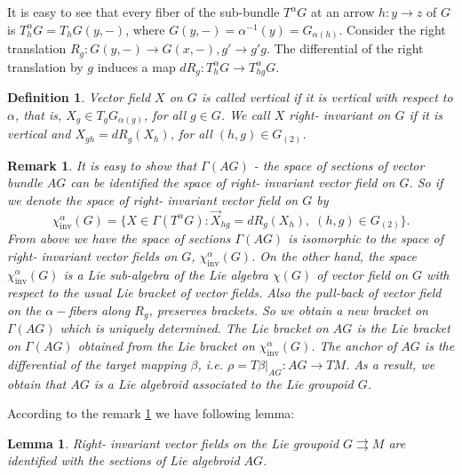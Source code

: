 \documentclass{article}
\newtheorem{definition}[theorem]{Definition}
\newtheorem{lemma}[theorem]{Lemma}
\newtheorem{remark}[theorem]{Remark}
\begin{document}
It is easy to see that every fiber of the sub-bundle $T^\alpha G$  at an arrow  $h: y\to z$ of $G$ is $T^{\alpha}_h G= T_hG(y,-)$,  where  $G(y,-)=\alpha^{-1}(y) = G_{\alpha(h)}$. Consider the right translation $R_g:G(y, -) \to G(x, -), g' \to g'g$.
The differential of the right translation by $g$ induces a map $ dR_g: T^\alpha_h G \to T^\alpha_{hg} G$.
\begin{definition}
Vector field $X$ on $G$ is called vertical if it is vertical with respect to $\alpha$, that is, $X_g\in T_gG_{\alpha(g)}$, for all $g\in G$. We call  $X$  right- invariant on $G$ if it is vertical and $X_{gh}=dR_g(X_h)$, for all $(h,g)\in G_{(2)}$. 
\end{definition}
\begin{remark}
It is easy to show that  $\Gamma(AG)$ - the space of sections of vector bundle $AG$ can be identified the space of right- invariant vector field on $G$.  So if we denote  the space of right- invariant vector field on $G$ by 
$$\chi^\alpha_{\mathrm{inv}}(G)=\{X\in \Gamma(T^\alpha G): \overrightarrow{X}_{hg}=dR_g(X_h), \;(h, g)\in G_{(2)}\}.$$
From above we have the space of sections  $\Gamma(AG)$ is isomorphic to the space of right- invariant vector fields on $G$, $\chi^\alpha_{\mathrm{inv}}(G)$. On the other hand, the space $\chi^\alpha_{\mathrm{inv}}(G)$ is a Lie sub-algebra of the Lie algebra $\chi(G)$ of vector field on $G$ with respect to the usual Lie bracket of vector fields. Also the pull-back of vector field on the $\alpha-$fibers along $R_g$, preserves brackets. So we obtain a new bracket on $\Gamma(AG)$ which is uniquely determined. The Lie bracket on $AG$ is the Lie bracket on  $\Gamma(AG)$ obtained from the Lie bracket on $\chi^\alpha_{\mathrm{inv}}(G)$. The anchor of $AG$ is the differential of the target mapping $\beta$, i.e. $\rho=T\beta|_{AG}: AG \to TM$. As a result, we obtain that $AG$ is a Lie algebroid associated to the Lie groupoid $G$.
\label{SVB}
\end{remark}
According to the remark  \ref{SVB} we have following lemma:
\begin{lemma}\label{lem0}
Right- invariant vector fields on the Lie groupoid $G \rightrightarrows M$ are identified with the sections of Lie algebroid $AG$.
\end{lemma}
\end{document}
